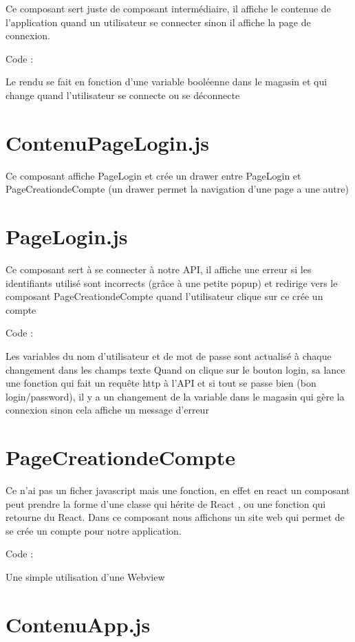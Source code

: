 Ce composant sert juste de composant intermédiaire, il affiche le contenue de l’application quand un utilisateur se connecter sinon il affiche la page de connexion.

Code :

Le rendu se fait en fonction d’une variable booléenne dans le magasin et qui change quand l’utilisateur se connecte ou se déconnecte

\section{ContenuPageLogin.js}

Ce composant affiche PageLogin et crée un drawer entre PageLogin et PageCreationdeCompte (un drawer permet la navigation d’une page a une autre)

\section{PageLogin.js}

Ce composant sert à se connecter à notre API, il affiche une erreur si les identifiants utilisé sont incorrects (grâce à une petite popup) et redirige vers le composant PageCreationdeCompte quand l’utilisateur clique sur ce crée un compte

Code :

Les variables du nom d’utilisateur et de mot de passe sont actualisé à chaque changement dans les champs texte
Quand on clique sur le bouton login, sa lance une fonction qui fait un requête http à l’API et si tout se passe bien (bon login/password), il y a un changement de la variable dans le magasin qui gère la connexion sinon cela affiche un message d’erreur

\section{PageCreationdeCompte}

Ce n’ai pas un ficher javascript mais une fonction, en effet en react un composant peut prendre la forme d’une classe qui hérite de React , ou une fonction qui retourne du React. Dans ce composant nous affichons un site web qui permet de se crée un compte pour notre application.

Code :

Une simple utilisation d’une Webview

\section{ContenuApp.js}

